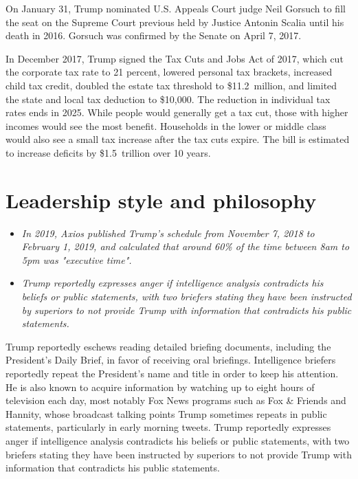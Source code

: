 On January 31, Trump nominated U.S. Appeals Court judge Neil Gorsuch to
fill the seat on the Supreme Court previous held by Justice Antonin
Scalia until his death in 2016. Gorsuch was confirmed by the Senate on
April 7, 2017.

In December 2017, Trump signed the Tax Cuts and Jobs Act of 2017, which
cut the corporate tax rate to 21 percent, lowered personal tax brackets,
increased child tax credit, doubled the estate tax threshold to
\$11.2~million, and limited the state and local tax deduction to
\$10,000. The reduction in individual tax rates ends in 2025. While
people would generally get a tax cut, those with higher incomes would
see the most benefit. Households in the lower or middle class would also
see a small tax increase after the tax cuts expire. The bill is
estimated to increase deficits by \$1.5~trillion over 10 years.

\section{Leadership style and
philosophy}\label{leadership-style-and-philosophy}

\begin{itemize}
\item
  \emph{In 2019, Axios published Trump's schedule from November 7, 2018
  to February 1, 2019, and calculated that around 60\% of the time
  between 8am to 5pm was "executive time".}
\item
  \emph{Trump reportedly expresses anger if intelligence analysis
  contradicts his beliefs or public statements, with two briefers
  stating they have been instructed by superiors to not provide Trump
  with information that contradicts his public statements.}
\end{itemize}

Trump reportedly eschews reading detailed briefing documents, including
the President's Daily Brief, in favor of receiving oral briefings.
Intelligence briefers reportedly repeat the President's name and title
in order to keep his attention. He is also known to acquire information
by watching up to eight hours of television each day, most notably Fox
News programs such as Fox \& Friends and Hannity, whose broadcast
talking points Trump sometimes repeats in public statements,
particularly in early morning tweets. Trump reportedly expresses anger
if intelligence analysis contradicts his beliefs or public statements,
with two briefers stating they have been instructed by superiors to not
provide Trump with information that contradicts his public statements.

